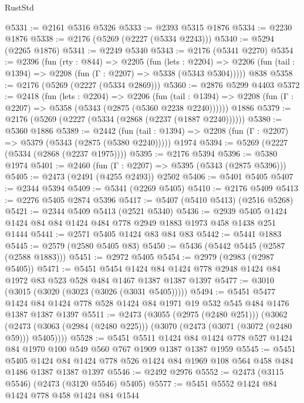 \begin{lexlean}{RustStd}
\begin{coremodule}
{\begin{coremodule}
{{{{{{{{{{@5331 := @2161 @5316 @5326
@5333 := @2393 @5315 @1876
@5334 := @2230 @1876
@5338 := @2176 (@5269 (@2227 (@5334 @2243)))
@5340 := @5294 (@2265 @1876)
@5341 := @2249 @5340
@5343 := @2176 (@5341 @2270)
@5354 := @2396
    (fun (rty : @844) =>
    @2205
      (fun (lets : @2204) =>
      @2206 (fun (tail : @1394) => @2208 (fun (Γ : @2207) => @5338 (@5343 @5304)))))
    @838
@5358 := @2176 (@5269 (@2227 (@5334 @2869)))
@5360 := @2876 @5299 @4403
@5372 := @2418
    (fun (lets : @2204) =>
    @2206
      (fun (tail : @1394) => @2208 (fun (Γ : @2207) => @5358 (@5343 (@2875 (@5360 @2238 @2240))))))
    @1886
@5379 := @2176 (@5269 (@2227 (@5334 (@2868 (@2237 (@1887 @2240))))))
@5380 := @5360 @1886
@5389 := @2442
    (fun (tail : @1394) => @2208 (fun (Γ : @2207) => @5379 (@5343 (@2875 (@5380 @2240)))))
    @1974
@5394 := @5269 (@2227 (@5334 (@2868 (@2237 @1975))))
@5395 := @2176 @5394
@5396 := @5380 @1974
@5401 := @2460 (fun (Γ : @2207) => @5395 (@5343 (@2875 @5396)))
@5405 := @2473 (@2491 (@4255 @2493)) @2502
@5406 := @5401 @5405
@5407 := @2344 @5394
@5409 := @5341 (@2269 @5405)
@5410 := @2176 @5409
@5413 := @2276 @5405 @2874 @5396
@5417 := @5407 (@5410 @5413) (@2516 @5268)
@5421 := @2344 @5409 @5413 (@2521 @5340)
@5436 := @2939 @5405 @1424 @1424 @84 @84 @1424 @484 @778 @2949 @1883 @1973 @458 @1438 @251 @1444
@5441 := @2571 @5405 @1424 @83 @84 @83
@5442 := @5441 @1883
@5445 := @2579 (@2580 @5405 @83)
@5450 := @5436 (@5442 @5445 (@2587 (@2588 @1883)))
@5451 := @2972 @5405
@5454 := @2979 (@2983 (@2987 @5405))
@5471 := @5451
    @5454
    @1424
    @84
    @1424
    @778
    @2948
    @1424
    @84
    @1972
    @83
    @523
    @528
    @484
    @1467
    @1387
    @1387
    @1397
@5477 := @3010 (@3015 (@3020 (@3023 (@3026 (@3031 @5405)))))
@5494 := @5451
    @5477
    @1424
    @84
    @1424
    @778
    @528
    @1424
    @84
    @1971
    @19
    @532
    @545
    @484
    @1476
    @1387
    @1387
    @1397
@5511 := @2473
    (@3055 (@2975 (@2480 @251)))
    (@3062 (@2473 (@3063 (@2984 (@2480 @225))) (@3070 (@2473 (@3071 (@3072 (@2480 @59))) @5405))))
@5528 := @5451
    @5511
    @1424
    @84
    @1424
    @778
    @527
    @1424
    @84
    @1970
    @100
    @549
    @560
    @767
    @1909
    @1387
    @1387
    @1959
@5545 := @5451
    @5405
    @1424
    @84
    @1424
    @778
    @526
    @1424
    @84
    @1969
    @108
    @564
    @458
    @484
    @1486
    @1387
    @1387
    @1397
@5546 := @2492 @2976
@5552 := @2473 (@3115 @5546) (@2473 (@3120 @5546) @5405)
@5577 := @5451
    @5552
    @1424
    @84
    @1424
    @778
    @458
    @1424
    @84
    @1544
}}}}}}}}}}
\end{coremodule}}
\end{coremodule}
\end{lexlean}

